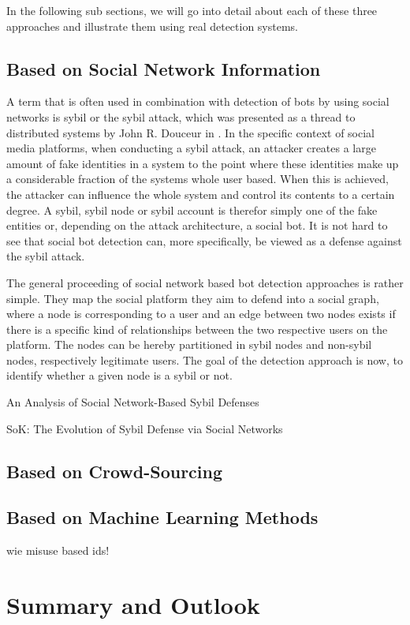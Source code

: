In the following sub sections, we will go into detail about each of these three approaches and illustrate them using real detection systems.

\subsection{Based on Social Network Information}
A term that is often used in combination with detection of bots by using social networks is sybil or the sybil attack, which was presented as a thread to distributed systems by John R. Douceur in \cite{sybil}. In the specific context of social media platforms, when conducting a sybil attack, an attacker creates a large amount of fake identities in a system to the point where these identities make up a considerable fraction of the systems whole user based. When this is achieved, the attacker can influence the whole system and control its contents to a certain degree. A sybil, sybil node or sybil account is therefor simply one of the fake entities or, depending on the attack architecture, a social bot. It is not hard to see that social bot detection can, more specifically, be viewed as a defense against the sybil attack.   

The general proceeding of social network based bot detection approaches is rather simple. They map the social platform they aim to defend into a social graph, where a node is corresponding to a user and an edge between two nodes exists if there is a specific kind of relationships between the two respective users on the platform. The nodes can be hereby partitioned in sybil nodes and non-sybil nodes, respectively legitimate users. The goal of the detection approach is now, to identify whether a given node is a sybil or not. \cite{socnetanalysis}

An Analysis of Social Network-Based Sybil Defenses

SoK: The Evolution of Sybil Defense via Social Networks


\subsection{Based on Crowd-Sourcing}


\subsection{Based on Machine Learning Methods}
wie misuse based ids!

\section{Summary and Outlook}


























\newpage